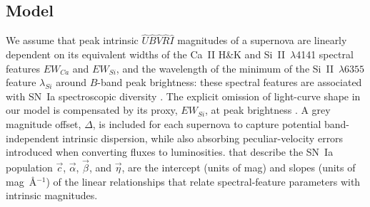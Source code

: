 \documentclass[trackchanges]{aastex61}   	%
\begin{document}
\subsection{Model}
We assume 
that  peak intrinsic ${\hat{U}}{\hat{B}}\hat{V}\hat{R}\hat{I}$ magnitudes of a supernova are linearly dependent
on its
 equivalent widths of the Ca~II H\&K and Si~II~$\lambda$4141 spectral features
$EW_{Ca}$ and $EW_{Si}$,
and the wavelength of the minimum of 
the Si~II~$\lambda6355$ feature $\lambda_{Si}$
around $B$-band peak brightness:
these spectral features are associated with SN~Ia  spectroscopic diversity  
\citep{2006PASP..118..560B, 2008A&A...492..535A, 2009A&A...500L..17B, 2009PASP..121..238B, 2009ApJ...699L.139W, 2011ApJ...729...55F}.
The explicit omission of light-curve shape in our model is compensated by its proxy,
$EW_{Si}$, at peak brightness
\citep{2008A&A...492..535A, 2011A&A...529L...4C}. 
A grey magnitude offset, $\Delta$, is included for each supernova
to capture 
potential
band-independent intrinsic dispersion, while also absorbing peculiar-velocity errors introduced when converting
fluxes to luminosities.
 that describe the SN~Ia population
$\vec{c}$, 
$\vec{\alpha}$, $\vec{\beta}$,  and $\vec{\eta}$,  are the intercept
(units of mag) and slopes (units of mag~\AA$^{-1}$)
of the linear relationships that
relate spectral-feature parameters with intrinsic magnitudes.
\end{document}
